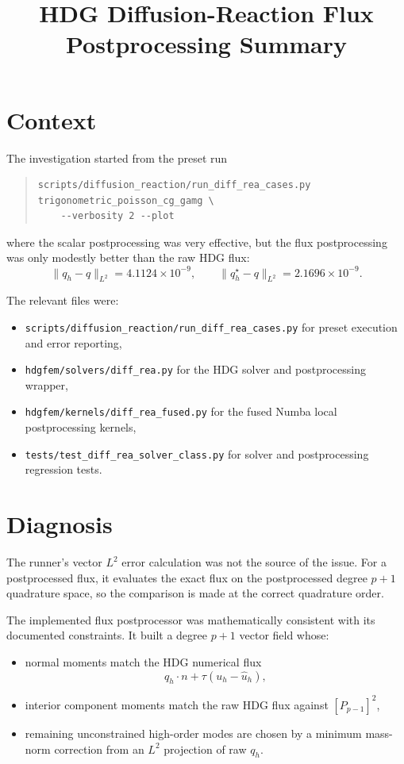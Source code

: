 \documentclass[11pt]{article}
\title{HDG Diffusion-Reaction Flux Postprocessing Summary}
\author{}
\date{}
\begin{document}
\maketitle

\section{Context}

The investigation started from the preset run
\begin{quote}
\small
\begin{verbatim}
scripts/diffusion_reaction/run_diff_rea_cases.py trigonometric_poisson_cg_gamg \
    --verbosity 2 --plot
\end{verbatim}
\end{quote}
where the scalar postprocessing was very effective, but the flux postprocessing
was only modestly better than the raw HDG flux:
\[
\|q_h - q\|_{L^2} = 4.1124 \times 10^{-9}, \qquad
\|q_h^\star - q\|_{L^2} = 2.1696 \times 10^{-9}.
\]

The relevant files were:
\begin{itemize}
    \item \verb|scripts/diffusion_reaction/run_diff_rea_cases.py| for preset execution and error reporting,
    \item \verb|hdgfem/solvers/diff_rea.py| for the HDG solver and postprocessing wrapper,
    \item \verb|hdgfem/kernels/diff_rea_fused.py| for the fused Numba local postprocessing kernels,
    \item \verb|tests/test_diff_rea_solver_class.py| for solver and postprocessing regression tests.
\end{itemize}

\section{Diagnosis}

The runner's vector $L^2$ error calculation was not the source of the issue.
For a postprocessed flux, it evaluates the exact flux on the postprocessed
degree $p+1$ quadrature space, so the comparison is made at the correct
quadrature order.

The implemented flux postprocessor was mathematically consistent with its
documented constraints. It built a degree $p+1$ vector field whose:
\begin{itemize}
    \item normal moments match the HDG numerical flux
    \[
    q_h \cdot n + \tau (u_h - \widehat{u}_h),
    \]
    \item interior component moments match the raw HDG flux against
    $[P_{p-1}]^2$,
    \item remaining unconstrained high-order modes are chosen by a minimum
    mass-norm correction from an $L^2$ projection of raw $q_h$.
\end{itemize}
\end{document}
